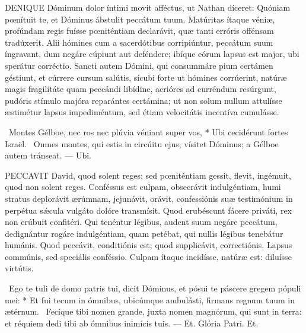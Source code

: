 
\lettrine[lines=2]{D}{ENIQUE} Dóminum dolor íntimi movit afféctus, ut Nathan díceret: Quóniam pœnítuit te, et Dóminus ábstulit peccátum tuum. Matúritas ítaque véniæ, profúndam regis fuísse pœniténtiam declarávit, quæ tanti erróris offénsam tradúxerit. Alii hómines cum a sacerdótibus corripiúntur, peccátum suum íngravant, dum negáre cúpiunt aut deféndere; ibíque eórum lapsus est major, ubi sperátur corréctio. Sancti autem Dómini, qui consummáre pium certámen géstiunt, et cúrrere cursum salútis, sícubi forte ut hómines corrúerint, natúræ magis fragilitáte quam peccándi libídine, acrióres ad curréndum resúrgunt, pudóris stímulo majóra reparántes certámina; ut non solum nullum attulísse æstimétur lapsus impediméntum, sed étiam velocitátis incentíva cumulásse.

\R\ Montes Gélboe, nec ros nec plúvia véniant super vos, * Ubi cecidérunt fortes Israël. \V\ Omnes montes, qui estis in circúitu ejus, vísitet Dóminus; a Gélboe autem tránseat. --- Ubi.


\lettrine[lines=2]{P}{ECCAVIT} David, quod solent reges; sed pœniténtiam gessit, flevit, ingémuit, quod non solent reges. Conféssus est culpam, obsecrávit indulgéntiam, humi stratus deplorávit ærúmnam, jejunávit, orávit, confessiónis suæ testimónium in perpétua sǽcula vulgáto dolóre transmísit. Quod erubéscunt fácere priváti, rex non erúbuit confitéri. Qui tenéntur légibus, audent suum negáre peccátum, dedignántur rogáre indulgéntiam, quam petébat, qui nullis légibus tenebátur humánis. Quod peccávit, conditiónis est; quod supplicávit, correctiónis. Lapsus commúnis, sed speciális conféssio. Culpam ítaque incidísse, natúræ est: diluísse virtútis.

\R\ Ego te tuli de domo patris tui, dicit Dóminus, et pósui te páscere gregem pópuli mei: * Et fui tecum in ómnibus, ubicúmque ambulásti, firmans regnum tuum in ætérnum. \V\ Fecíque tibi nomen grande, juxta nomen magnórum, qui sunt in terra: et réquiem dedi tibi ab ómnibus inimícis tuis. --- Et. Glória Patri. Et.


